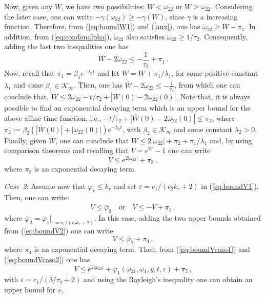 \documentclass{rncauth}
\begin{document}
Now, given any $W$, we have two possibilities: $W\!<\!\omega_{22}$
or $W\!\geq\!\omega_{22}$. Considering the later case, one can
write $-\gamma(\omega_{22}) \geq -\gamma(W)$, since $\gamma$ is a
increasing function. Therefore, from (\ref{eq:boundW1}) and
(\ref{aux}), one has $\dot{\omega}_{22}\geq \dot{W}-\pi_1$. In
addition, from (\ref{eq:condonalpha}), $\dot{\omega}_{22}$ also
satisfies $\dot{\omega}_{22}\geq 1/\tau_2$. Consequently, adding
the last two inequalities one has
%
$$\dot{W} - 2\dot{\omega}_{22} \leq -\frac{1}{\tau_2}+\pi_1\,.$$
%
Now, recall that $\pi_1=\beta_1 e^{-\lambda_1 t}$ and let
$\bar{W}=W+\pi_1/\lambda_1$, for some positive constant
$\lambda_1$ and some $\beta_1\in\mathcal{K}_\infty$. Then, one has
$\dot{\bar{W}}- 2\dot{\omega}_{22} \leq -\frac{1}{\tau_2}$, from
which one can conclude that, $\bar{W} \leq 2\omega_{22} - t/\tau_2
+ |\bar{W}(0)-2\omega_{22}(0)|$. Note that, it is always possible
to find an exponential decaying term which is an upper bound for
the above affine time function, i.e., $- t/\tau_2 +
|\bar{W}(0)-2\omega_{22}(0)| \leq \pi_2$, where
$\pi_2:=\beta_2(|\bar{W}(0)|+|\omega_{22}(0)|) e^{-\lambda_2 t}$,
with $\beta_2 \in \mathcal{K}_\infty$ and some constant
$\lambda_2>0$. Finally, given $W$, one can conclude that $W \leq 2
|\omega_{22}| + \pi_2+\pi_1/\lambda_1$ and, by using comparison
theorems \cite{K:02} and recalling that $V=e^{W}-1$ one can write
%
\begin{equation}
V\leq e^{2|\omega_{22}|}+\pi_3\,, \label{eq:boundVcaso1}
\end{equation}
%
where $\pi_3$ is an exponential decaying term.



{\em Case~2}:
Assume now that $\varphi_r \leq k_r$ and set $\varepsilon=c_1/(c_2
k_r + 2)$ in (\ref{eq:boundV1}). Then, one can write:
%
\begin{equation}
V\leq\bar{\varphi}_2\quad \mbox{or} \quad \dot{V} \leq - V
+\pi_1\,, \label{eq:boundV2}
\end{equation}
%
where $\bar{\varphi}_2=\bar{\varphi}_1|_{\varepsilon=c_1/(c_2 k_r
+ 2)}$. In this case, adding the two upper bounds obtained from
(\ref{eq:boundV2}) one can write
%
\begin{equation}
V\leq\bar{\varphi}_2+\pi_4\,, \label{eq:boundVcaso2}
\end{equation}
%
where $\pi_4$ is an exponential decaying term.
%
Then, from (\ref{eq:boundVcaso1}) and (\ref{eq:boundVcaso2}) one
has
%
\begin{equation}
V\leq
e^{2|\omega_{22}|}+\bar{\varphi}_1(\omega_{21},\omega_1,y,t,\varepsilon)+\pi_5\,,
\label{eq:boundVcaso12}
\end{equation}
%
with $\varepsilon=c_1/(3/\tau_2 + 2)$ and using the Rayleigh's
inequality one can obtain an upper bound for $v$.
\end{document}
